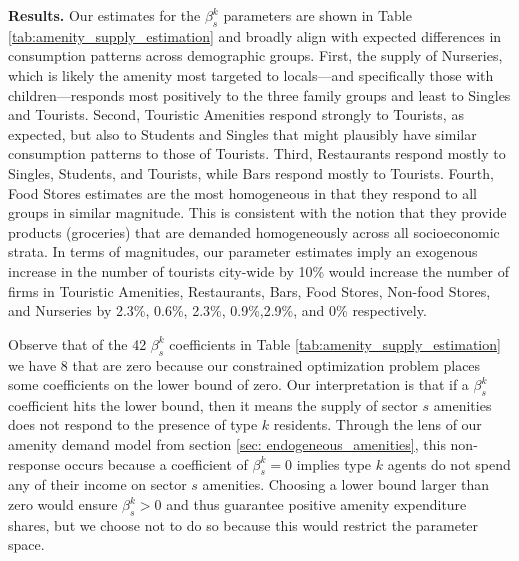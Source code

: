 \documentclass[11pt]{article}
\newcommand{\Paragraph}{\vspace{0.1cm}\noindent\textbf}
\begin{document}
\Paragraph{Results.} Our estimates for the $\beta^k_s$ parameters are shown in Table \ref{tab:amenity_supply_estimation} and broadly align with expected differences in consumption patterns across demographic groups. First, the supply of Nurseries, which is likely the amenity most targeted to locals---and specifically those with children---responds most positively to the three family groups and least to Singles and Tourists. Second, Touristic Amenities respond strongly to Tourists, as expected, but also to Students and Singles that might plausibly have similar consumption patterns to those of Tourists. Third, Restaurants respond mostly to Singles, Students, and Tourists, while Bars respond mostly to Tourists. Fourth, Food Stores estimates are the most homogeneous in that they respond to all groups in similar magnitude. This is consistent with the notion that they provide products (groceries) that are demanded homogeneously across all socioeconomic strata. In terms of magnitudes, our parameter estimates imply an exogenous increase in the number of tourists city-wide by 10\% would increase the number of firms in Touristic Amenities, Restaurants, Bars, Food Stores, Non-food Stores, and Nurseries by 2.3\%, 0.6\%, 2.3\%, 0.9\%,2.9\%, and 0\% respectively.

Observe that of the 42 $\beta_s^k$ coefficients in Table \ref{tab:amenity_supply_estimation} we have 8 that are zero because our constrained optimization problem places some coefficients on the lower bound of zero. Our interpretation is that if a $\beta_s^k$ coefficient hits the lower bound, then it means the supply of sector $s$ amenities does not respond to the presence of type $k$ residents. Through the lens of our amenity demand model from section \ref{sec: endogeneous_amenities}, this non-response occurs because a coefficient of $\beta_s^k=0$ implies type $k$ agents do not spend any of their income on sector $s$ amenities. Choosing a lower bound larger than zero would ensure $\beta^k_s > 0$ and thus guarantee positive amenity expenditure shares, but we choose not to do so because this would restrict the parameter space.
\end{document}

